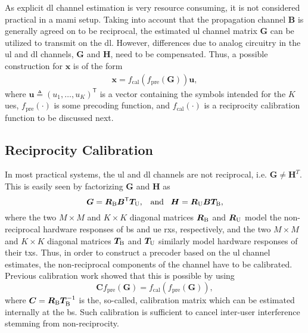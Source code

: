 \documentclass[journal]{IEEEtran}
\begin{document}
As explicit \gls{dl} channel estimation is very resource consuming, it is not considered practical in a \gls{mami} setup\cite{Marzetta2010}.
%
Taking into account that the propagation channel $\bm{B}$ is generally agreed on to be reciprocal\cite{DBLP:journals/corr/VieiraREMLT16}, the estimated \gls{ul} channel matrix $\bm{G}$ can be utilized to transmit on the \gls{dl}.
However, differences due to analog circuitry in the \gls{ul} and \gls{dl} channels, $\bm{G}$ and $\bm{H}$, need to be compensated.
Thus, a possible construction for $\bm{x}$ is of the form
\begin{align}
\label{eq:SteffensAss}
\bm{x} =   f_\text{cal}(  f_\text{pre}(\bm{G}))\bm{u},
\end{align}
where $\bm{u} \triangleq  (u_1, \ldots ,u_K)^\mathsf{T}$ is a vector containing the symbols intended for the $K$ \glspl{ue}, $f_\text{pre}( \cdot )$ is some precoding function, and $f_\text{cal}( \cdot )$ is a reciprocity calibration function to be discussed next.

%
%
%
%
%

\subsection{Reciprocity Calibration}
\label{subsec:rec_cal}

In most practical systems, the \gls{ul} and \gls{dl} channels are not reciprocal, i.e. $\bm{G} \neq \bm{H}^T$. This is easily seen by factorizing $\bm{G}$ and $\bm{H}$ as
\begin{equation}
\label{eq:Gfact}
\bm{G} = \bm{R}_{\rm B}  \bm{B}^\mathsf{T} \bm{T}_{\rm U}, \; \; \; {\rm and} \; \; \; \bm{H} = \bm{R}_{\rm U}  \bm{B} \bm{T}_{\rm B},
\end{equation}
%
where the two $M\times M$ and $K\times K$ diagonal matrices $\bm{R}_{\rm B}$ and $\bm{R}_{\rm U}$ model the non-reciprocal hardware responses of \gls{bs} and \gls{ue} \glspl{rx}, respectively, and the two $M\times M$ and $K\times K$ diagonal matrices $\bm{T}_{\rm B}$ and $\bm{T}_{\rm U}$ similarly model hardware responses of their \glspl{tx}. Thus, in order to construct a precoder based on the \gls{ul} channel estimates, the non-reciprocal components of the channel have to be calibrated. Previous calibration work showed that this is possible by using 
\begin{equation}
\label{eq:Calibration}
\bm{C} f_\text{pre}(\bm{G}) = f_\text{cal}(  f_\text{pre}(\bm{G})),
\end{equation}
where $\bm{C}=\bm{R}_{\rm B} \bm{T}^{-1}_{\rm B}$ is the, so-called, calibration matrix which can be estimated internally at the \gls{bs}\cite{DBLP:journals/corr/VieiraREMLT16}. Such calibration is sufficient to cancel inter-user interference stemming from non-reciprocity\cite{6760595}.
\end{document}
